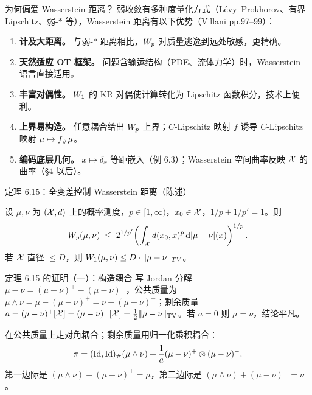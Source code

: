 \begin{frame}{为何偏爱 Wasserstein 距离？}
  弱收敛有多种度量化方式（Lévy–Prokhorov、有界 Lipschitz、弱-$*$ 等），Wasserstein 距离有以下优势（Villani pp.97--99）：

  \begin{enumerate}\small
    \item \textbf{计及大距离。} 与弱-$*$ 距离相比，$W_{p}$ 对质量逃逸到远处敏感，更精确。
    \item \textbf{天然适应 OT 框架。} 问题含输运结构（PDE、流体力学）时，Wasserstein 语言直接适用。
    \item \textbf{丰富对偶性。} $W_{1}$ 的 KR 对偶使计算转化为 Lipschitz 函数积分，技术上便利。
    \item \textbf{上界易构造。} 任意耦合给出 $W_{p}$ 上界；$C$-Lipschitz 映射 $f$ 诱导 $C$-Lipschitz 映射 $\mu\mapsto{f}_{\#}\mu$。
    \item \textbf{编码底层几何。} $x\mapsto\delta_{x}$ 等距嵌入（例 6.3）；Wasserstein 空间曲率反映 $\mathcal{X}$ 的曲率（§4 以后）。
  \end{enumerate}

\end{frame}

\begin{frame}{定理 6.15：全变差控制 Wasserstein 距离（陈述）}

  设 $\mu,\nu$ 为 $(\mathcal{X},d)$ 上的概率测度，$p\in[1,\infty)$，$x_{0}\in\mathcal{X}$，$1/p+1/p'=1$。则
  \[
    W_{p}(\mu,\nu)
    \;\le\; 2^{1/p'}\!\left(\int_{\mathcal{X}} d(x_{0},x)^{p}\,\mathrm{d}|\mu-\nu|(x)\right)^{1/p}.
  \]
   若 $\mathcal{X}$ 直径 $\le D$，则 $W_{1}(\mu,\nu)\le D\cdot\|\mu-\nu\|_{TV}$。

\end{frame}

\begin{frame}{定理 6.15 的证明（一）：构造耦合}
   写 Jordan 分解 $\mu-\nu=(\mu-\nu)^{+}-(\mu-\nu)^{-}$，公共质量为 $\mu\wedge\nu=\mu-(\mu-\nu)^{+}=\nu-(\mu-\nu)^{-}$；剩余质量
  $a=(\mu-\nu)^{+}[\mathcal{X}]=(\mu-\nu)^{-}[\mathcal{X}]=\frac12\|\mu-\nu\|_{\mathrm{TV}}$。\proofskipnote 若 $a=0$ 则 $\mu=\nu$，结论平凡。

   在公共质量上走对角耦合；剩余质量用归一化乘积耦合：
  \[
    \pi=(\mathrm{Id},\mathrm{Id})_{\#}(\mu\wedge\nu)
    +\frac{1}{a}(\mu-\nu)^{+}\otimes(\mu-\nu)^{-}.
  \]
  第一边际是 $(\mu\wedge\nu)+(\mu-\nu)^{+}=\mu$，第二边际是 $(\mu\wedge\nu)+(\mu-\nu)^{-}=\nu$。

\end{frame}

